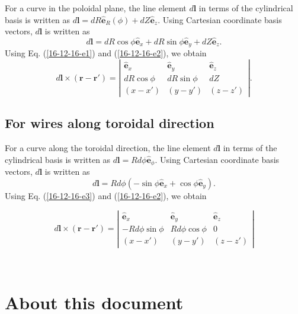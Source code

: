 \documentclass{llncs}
\begin{document}
For a curve in the poloidal plane, the line element $d\mathbf{l}$ in terms of
the cylindrical basis is written as $d\mathbf{l}= d R \hat{\mathbf{e}}_R
(\phi) + d Z \hat{\mathbf{e}}_z$. Using Cartesian coordinate basis vectors,
$d\mathbf{l}$ is written as
\begin{equation}
  \label{16-12-16-e1} d\mathbf{l}= d R \cos \phi \hat{\mathbf{e}}_x + d R \sin
  \phi \hat{\mathbf{e}}_y + d Z \hat{\mathbf{e}}_z .
\end{equation}
Using Eq. (\ref{16-12-16-e1}) and (\ref{16-12-16-e2}), we obtain
\begin{equation}
  d\mathbf{l} \times (\mathbf{r}-\mathbf{r}') = \left|\begin{array}{ccc}
    \hat{\mathbf{e}}_x & \hat{\mathbf{e}}_y & \hat{\mathbf{e}}_z\\
    d R \cos \phi & d R \sin \phi & d Z\\
    (x - x') & (y - y') & (z - z')
  \end{array}\right| .
\end{equation}

\subsection{For wires along toroidal direction}

For a curve along the toroidal direction, the line element $d\mathbf{l}$ in
terms of the cylindrical basis is written as $d\mathbf{l}= R d \phi
\hat{\mathbf{e}}_{\phi}$. Using Cartesian coordinate basis vectors,
$d\mathbf{l}$ is written as
\begin{equation}
  \label{16-12-16-e3} d\mathbf{l}= R d \phi (- \sin \phi \hat{\mathbf{e}}_x +
  \cos \phi \hat{\mathbf{e}}_y) .
\end{equation}
Using Eq. (\ref{16-12-16-e3}) and (\ref{16-12-16-e2}), we obtain


\begin{equation}
  d\mathbf{l} \times (\mathbf{r}-\mathbf{r}') = \left|\begin{array}{ccc}
    \hat{\mathbf{e}}_x & \hat{\mathbf{e}}_y & \hat{\mathbf{e}}_z\\
    - R d \phi \sin \phi & R d \phi \cos \phi & 0\\
    (x - x') & (y - y') & (z - z')
  \end{array}\right|
\end{equation}


\

\section{About this document}
\end{document}
